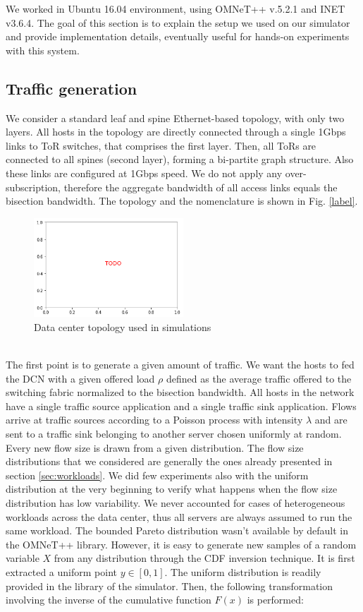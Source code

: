 We worked in Ubuntu 16.04 environment, using OMNeT++ v.5.2.1 and INET v3.6.4. 
The goal of this section is to explain the setup we used on our simulator and provide implementation details, eventually useful for hands-on experiments with this system. 
\subsection{Traffic generation}
We consider a standard leaf and spine Ethernet-based topology, with only two layers. All hosts in the topology are directly connected through a single 1Gbps links to ToR switches, that comprises the first layer. Then, all ToRs are connected to all spines (second layer), forming a bi-partite graph structure. Also these links are configured at 1Gbps speed. We do not apply any over-subscription, therefore the aggregate bandwidth of all access links equals the bisection bandwidth. The topology and the nomenclature is shown in Fig. \ref{label}.
\begin{figure}
	\centering
	\includegraphics[width=0.5\textwidth]{Chapter3/Figures/todored}
	\caption{Data center topology used in simulations}
\end{figure}%
\\The first point is to generate a given amount of traffic. We want the hosts to fed the DCN with a given offered load $\rho$ defined as the average traffic offered to the switching fabric normalized to the bisection bandwidth. All hosts in the network have a single traffic source application and a single traffic sink application. Flows arrive at traffic sources according to a Poisson process with intensity $\lambda$ and are sent to a traffic sink belonging to another server chosen uniformly at random. Every new flow size is drawn from a given distribution. The flow size distributions that we considered are generally the ones already presented in section \ref{sec:workloads}. We did few experiments also with the uniform distribution at the very beginning to verify what happens when the flow size distribution has low variability. We never accounted for cases of heterogeneous workloads across the data center, thus all servers are always assumed to run the same workload. The bounded Pareto distribution wasn't available by default in the OMNeT++ library. However, it is easy to generate new samples of a random variable $X$ from any distribution through the CDF inversion technique. It is first extracted a uniform point $y \in [0,1]$. The uniform distribution is readily provided in the library of the simulator. Then, the following transformation involving the inverse of the cumulative function $F(x)$ is performed:
